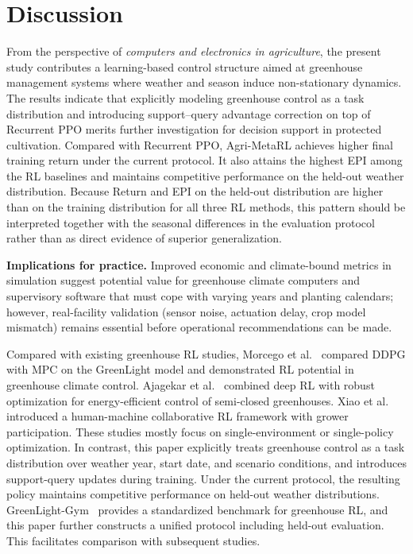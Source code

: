 \documentclass[number,preprint,review,12pt]{elsarticle}
\begin{document}
\section{Discussion}
From the perspective of \emph{computers and electronics in agriculture}, the present study contributes a learning-based control structure aimed at greenhouse management systems where weather and season induce non-stationary dynamics. The results indicate that explicitly modeling greenhouse control as a task distribution and introducing support--query advantage correction on top of Recurrent PPO merits further investigation for decision support in protected cultivation. Compared with Recurrent PPO, Agri-MetaRL achieves higher final training return under the current protocol. It also attains the highest EPI among the RL baselines and maintains competitive performance on the held-out weather distribution. Because Return and EPI on the held-out distribution are higher than on the training distribution for all three RL methods, this pattern should be interpreted together with the seasonal differences in the evaluation protocol rather than as direct evidence of superior generalization.

\textbf{Implications for practice.} Improved economic and climate-bound metrics in simulation suggest potential value for greenhouse climate computers and supervisory software that must cope with varying years and planting calendars; however, real-facility validation (sensor noise, actuation delay, crop model mismatch) remains essential before operational recommendations can be made.

Compared with existing greenhouse RL studies, Morcego et al.~\cite{morcego2023reinforcement} compared DDPG with MPC on the GreenLight model and demonstrated RL potential in greenhouse climate control. Ajagekar et al.~\cite{ajagekar2023energy} combined deep RL with robust optimization for energy-efficient control of semi-closed greenhouses. Xiao et al.~\cite{xiao2026grower} introduced a human-machine collaborative RL framework with grower participation. These studies mostly focus on single-environment or single-policy optimization. In contrast, this paper explicitly treats greenhouse control as a task distribution over weather year, start date, and scenario conditions, and introduces support-query updates during training. Under the current protocol, the resulting policy maintains competitive performance on held-out weather distributions. GreenLight-Gym~\cite{van2025greenlight} provides a standardized benchmark for greenhouse RL, and this paper further constructs a unified protocol including held-out evaluation. This facilitates comparison with subsequent studies.
\end{document}
